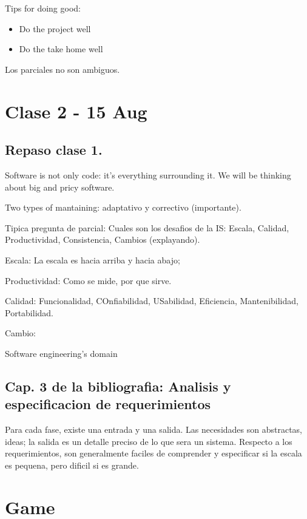 \documentclass[a4paper, 12pt]{article}
\begin{document}
Tips for doing good:

\begin{itemize}
    \item Do the project well 
    \item Do the take home well
\end{itemize}

Los parciales no son ambiguos.

\section{Clase 2 - 15 Aug}

\subsection{Repaso clase 1.}

Software is not only code: it's everything surrounding it. We will be thinking
about big and pricy software.

Two types of mantaining: adaptativo y correctivo (importante).

Tipica pregunta de parcial: Cuales son los desafios de la IS: Escala, Calidad,
Productividad, Consistencia, Cambios (explayando).

Escala: La escala es hacia arriba y hacia abajo; 

Productividad: Como se mide, por que sirve. 

Calidad: Funcionalidad, COnfiabilidad, USabilidad, Eficiencia, Mantenibilidad, Portabilidad. 

Cambio:

Software engineering's domain

\subsection{Cap. 3 de la bibliografia: Analisis y especificacion de requerimientos}

Para cada fase, existe una entrada y una salida. Las necesidades son abstractas, ideas; la salida es 
un detalle preciso de lo que sera un sistema. Respecto a los requerimientos, son generalmente 
faciles de comprender y especificar si la escala es pequena, pero dificil si es grande.

\pagebreak 

\section{Game}
\end{document}
